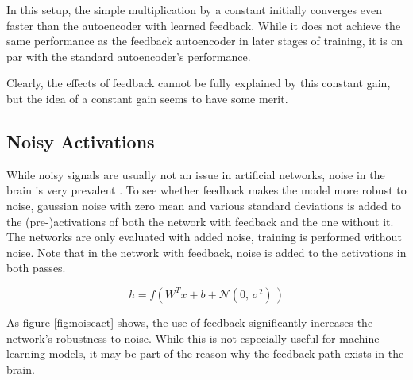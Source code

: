 \documentclass{article}
\begin{document}
  In this setup, the simple multiplication by a constant initially converges even faster than the autoencoder with learned feedback. While it does not achieve the same performance as the feedback autoencoder in later stages of training, it is on par with the standard autoencoder's performance. 
  
  Clearly, the effects of feedback cannot be fully explained by this constant gain, but the idea of a constant gain seems to have some merit. 


\subsection{Noisy Activations} 
While noisy signals are usually not an issue in artificial networks, noise in the brain is very prevalent \cite{Faisal2008}. To see whether feedback makes the model more robust to noise, gaussian noise with zero mean and various standard deviations is added to the (pre-)activations of both the network with feedback and the one without it. The networks are only evaluated with added noise, training is performed without noise. Note that in the network with feedback, noise is added to the activations in both passes.    

		
	\begin{equation}
		h = f(W^T x + b + \mathcal{N}(0,\,\sigma^{2})\,)
	\end{equation}
	
	
	As figure \ref{fig:noiseact} shows, the use of feedback significantly increases the network's robustness to noise. While this is not especially useful for machine learning models, it may be part of the reason why the feedback path exists in the brain. 
\end{document}
